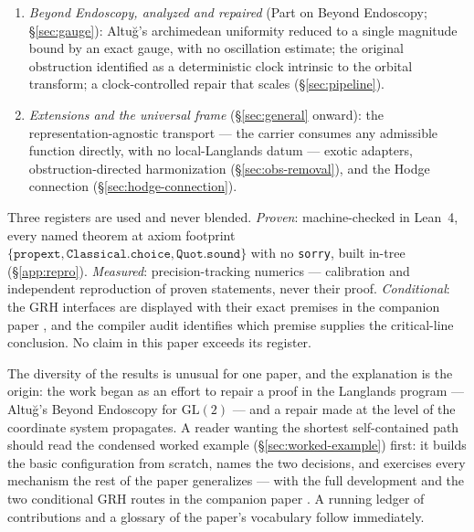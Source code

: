 \documentclass[11pt]{article}
\theoremstyle{definition}
\begin{document}
\begin{enumerate}
Corollary~\ref{cor:ramanujan}): the tower closes the loss ledger's radial
channel --- strand radius exactly one at every unramified place, zero radial
drift at the archimedean place ($\lambda\ge\tfrac14$ for Maass $\pi$); the
limit step machine-checked (\texttt{RamanujanLimit}).
\item \emph{Beyond Endoscopy, analyzed and repaired} (Part on Beyond
Endoscopy; \S\ref{sec:gauge}): Altu\u{g}'s archimedean uniformity reduced to a
single magnitude bound by an exact gauge, with no oscillation estimate; the
original obstruction identified as a deterministic clock intrinsic to the
orbital transform; a clock-controlled repair that scales
(\S\ref{sec:pipeline}).
\item \emph{Extensions and the universal frame} (\S\ref{sec:general} onward):
the representation-agnostic transport --- the carrier consumes any admissible
function directly, with no local-Langlands datum --- exotic adapters,
obstruction-directed harmonization (\S\ref{sec:obs-removal}), and the Hodge
connection (\S\ref{sec:hodge-connection}).
\end{enumerate}

Three registers are used and never blended. \emph{Proven}: machine-checked in
Lean~4, every named theorem at axiom footprint
$\{\texttt{propext},\texttt{Classical.choice},\texttt{Quot.sound}\}$ with no
\texttt{sorry}, built in-tree (\S\ref{app:repro}). \emph{Measured}:
precision-tracking numerics --- calibration and independent reproduction of
proven statements, never their proof. \emph{Conditional}: the GRH interfaces
are displayed with their exact premises in the companion paper
\cite{GRHCompanion}, and the compiler audit identifies which premise supplies
the critical-line conclusion. No claim in this paper exceeds its register.

The diversity of the results is unusual for one paper, and the explanation is
the origin: the work began as an effort to repair a proof in the Langlands
program --- Altu\u{g}'s Beyond Endoscopy for $\mathrm{GL}(2)$ --- and a repair
made at the level of the coordinate system propagates. A reader wanting the
shortest self-contained path should read the condensed worked example
(\S\ref{sec:worked-example}) first: it builds the basic configuration from
scratch, names the two decisions, and exercises every mechanism the rest of
the paper generalizes --- with the full development and the two conditional
GRH routes in the companion paper \cite{GRHCompanion}. A running ledger of
contributions and a glossary of the paper's vocabulary follow immediately.
\end{document}
